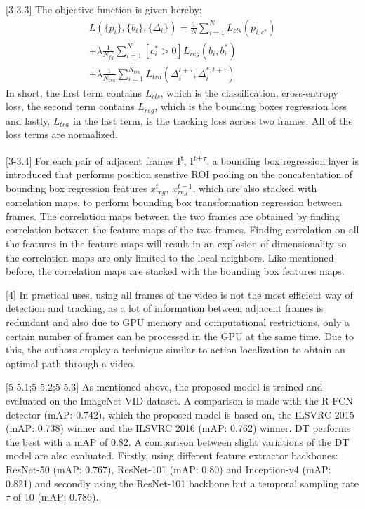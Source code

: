 \documentclass[conference]{IEEEtran}
\begin{document}
[3-3.3] The objective function is given hereby:
\begin{equation*}
\begin{aligned}
L(\{p_{i}\},\{b_{i}\},\{\Delta _{i}\}) = \frac{1}{N}\sum_{i=1}^{N}L_{cls}(p_{i,c^{*}})
\\+ \lambda \frac{1}{N_{fg}}\sum_{i=1}^{N}[c_{i}^{*}>0]L_{reg}(b_{i},b_{i}^{*})\\+ \lambda \frac{1}{N_{tra}}\sum_{i=1}^{N_{tra}}L_{tra}(\Delta _{i}^{t+\tau}, \Delta _{i}^{*, t+\tau})
\end{aligned}
\end{equation*}
In short, the first term contains $L_{cls}$, which is the classification, cross-entropy loss, the second term contains $L_{reg}$, which is the bounding boxes regression loss and lastly, $L_{tra}$ in the last term, is the tracking loss across two frames. All of the loss terms are normalized. \newline

[3-3.4] For each pair of adjacent frames I\textsuperscript{t}, I\textsuperscript{t+$\tau$}, a bounding box regression layer is introduced that performs position senstive ROI pooling on the concatentation of bounding box regression features $x^t_{reg}$, $x^{t-1}_{reg}$, which are also stacked with correlation maps, to perform bounding box transformation regression between frames. The correlation maps between the two frames are obtained by finding correlation between the feature maps of the two frames. Finding correlation on all the features in the feature maps will result in an explosion of dimensionality so the correlation maps are only limited to the local neighbors. Like mentioned before, the correlation maps are stacked with the bounding box features maps. \newline

[4] In practical uses, using all frames of the video is not the most efficient way of detection and tracking, as a lot of information between adjacent frames is redundant and also due to GPU memory and computational restrictions, only a certain number of frames can be processed in the GPU at the same time. Due to this, the authors employ a technique similar to action localization\cite{b41} to obtain an optimal path through a video. \newline

[5-5.1;5-5.2;5-5.3] As mentioned above, the proposed model is trained and evaluated on the ImageNet VID dataset. A comparison is made with the R-FCN detector (mAP: 0.742), which the proposed model is based on, the ILSVRC 2015\cite{b42} (mAP: 0.738) winner and the ILSVRC 2016\cite{b43} (mAP: 0.762) winner. DT performs the best with a mAP of 0.82. A comparison between slight variations of the DT model are also evaluated. Firstly, using different feature extractor backbones: ResNet-50 (mAP: 0.767), ResNet-101 (mAP: 0.80) and Inception-v4 (mAP: 0.821)\cite{b44} and secondly using the ResNet-101 backbone but a temporal sampling rate $\tau$ of 10 (mAP: 0.786).
\end{document}
